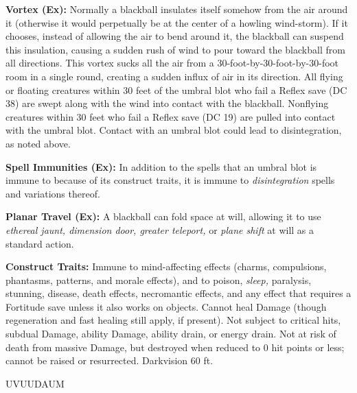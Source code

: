 \documentclass{article}
\begin{document}
{\textbf{Vortex (Ex):} Normally a blackball insulates itself somehow from the air 
around it (otherwise it would perpetually be at the center of a howling wind-storm). 
If it chooses, instead of allowing the air to bend around it, the blackball can 
suspend this insulation, causing a sudden rush of wind to pour toward the blackball 
from all directions. This vortex sucks all the air from a 30-foot-by-30-foot-by-30-foot 
room in a single round, creating a sudden influx of air in its direction. All flying 
or floating creatures within 30 feet of the umbral blot who fail a Reflex save 
(DC 38) are swept along with the wind into contact with the blackball. Nonflying 
creatures within 30 feet who fail a Reflex save (DC 19) are pulled into contact 
with the umbral blot. Contact with an umbral blot could lead to disintegration, 
as noted above. 

\textbf{Spell Immunities (Ex):} In addition to the spells that an umbral blot is 
immune to because of its construct traits, it is immune to \textit{disintegration 
}spells and variations thereof. 

\textbf{Planar Travel (Ex):} A blackball can fold space at will, allowing it to 
use \textit{ethereal jaunt, dimension door, greater teleport, }or \textit{plane 
shift }at will as a standard action. 

\textbf{Construct Traits:} Immune to mind-affecting effects (charms, compulsions, 
phantasms, patterns, and morale effects), and to poison, \textit{sleep, }paralysis, 
stunning, disease, death effects, necromantic effects, and any effect that requires 
a Fortitude save unless it also works on objects. Cannot heal Damage (though regeneration 
and fast healing still apply, if present). Not subject to critical hits, subdual 
Damage, ability Damage, ability drain, or energy drain. Not at risk of death from 
massive Damage, but destroyed when reduced to 0 hit points or less; cannot be raised 
or resurrected. Darkvision 60 ft. 

\vspace{12pt}
{\LARGE{}UVUUDAUM }

}
\end{document}

